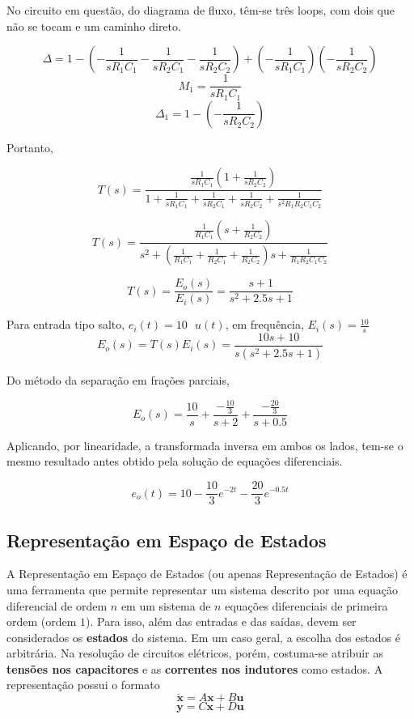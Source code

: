 \documentclass{article}
\numberwithin{equation}{section}
\begin{document}
No circuito em questão, do diagrama de fluxo, têm-se três loops, com dois que não se tocam e um caminho direto.

$$\Delta = 1 - \left(-\frac{1}{sR_{1}C_{1}}-\frac{1}{sR_{2}C_{1}}-\frac{1}{sR_{2}C_{2}}\right) + \left(-\frac{1}{sR_{1}C_{1}}\right) \left(-\frac{1}{sR_{2}C_{2}}\right) $$
$$M_{1} = \frac{1}{sR_{1}C_{1}} $$
$$\Delta_{1} = 1 - \left(-\frac{1}{sR_{2}C_{2}}\right)$$

Portanto,

$$T(s) = \frac{\displaystyle{\frac{1}{sR_{1}C_{1}}} \left(1 +\displaystyle{\frac{1}{sR_{2}C_{2}}}\right)}{1 + \displaystyle{\frac{1}{sR_{1}C_{1}}}+\displaystyle{\frac{1}{sR_{2}C_{1}}}+\displaystyle{\frac{1}{sR_{2}C_{2}}} + \frac{1}{s^2R_{1}R_{2}C_{1}C_{2}}}$$

$$T(s) = \frac{\displaystyle{\frac{1}{R_{1}C_{1}}} \left(s +\displaystyle{\frac{1}{R_{2}C_{2}}}\right)}{s^2 + \left(\displaystyle{\frac{1}{R_{1}C_{1}}}+\displaystyle{\frac{1}{R_{2}C_{1}}}+\displaystyle{\frac{1}{R_{2}C_{2}}}\right)s + \displaystyle{\frac{1}{R_{1}R_{2}C_{1}C_{2}}}}$$

$$T(s) = \frac{E_{o}(s)}{E_{i}(s)} =\displaystyle{\frac{s+1}{s^2+2.5s+1}}$$

Para entrada tipo salto, $e_i(t) = 10 \text{ } u(t)$, em frequência, $E_{i}(s)=\displaystyle{\frac{10}{s}}$
$$E_{o}(s)=T(s)E_{i}(s)=\displaystyle{\frac{10s+10}{s(s^2+2.5s+1)}}$$

Do método da separação em frações parciais,

$$E_{o}(s) = \frac{10}{s} +\frac{-\displaystyle{\frac{10}{3}}}{s+2} +\frac{-\displaystyle{\frac{20}{3}}}{s+0.5}$$

Aplicando, por linearidade, a transformada inversa em ambos os lados, tem-se o mesmo resultado antes obtido pela solução de equações diferenciais.

$$e_{o}(t) = 10 - \frac{10}{3}e^{-2t} - \frac{20}{3}e^{-0.5t}$$

\subsection{Representação em Espaço de Estados}
\label{subsec:estado}
A Representação em Espaço de Estados (ou apenas Representação de Estados) é uma ferramenta que permite representar um sistema descrito por uma equação diferencial de ordem $n$ em um sistema de $n$ equações diferenciais de primeira ordem (ordem $1$). Para isso, além das entradas e das saídas, devem ser considerados os \textbf{estados} do sistema. Em um caso geral, a escolha dos estados é arbitrária. Na resolução de circuitos elétricos, porém, costuma-se atribuir as \textbf{tensões nos capacitores} e as \textbf{correntes nos indutores} como estados. A representação possui o formato
\begin{equation}
    \dot{\textbf{x}}=A\textbf{x}+B\textbf{u}
\end{equation}
\begin{equation}
    \textbf{y}=C\textbf{x}+D\textbf{u}
\end{equation}
\end{document}
